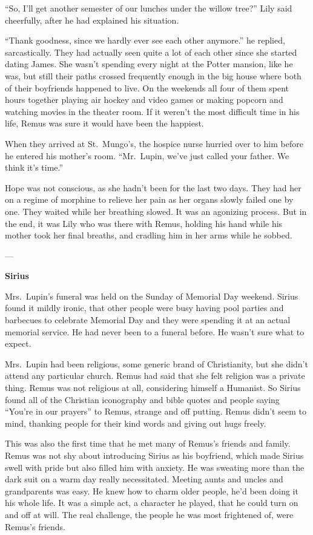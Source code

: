 \documentclass[12pt,twoside,openright]{memoir}
\begin{document}
``So, I'll get another semester of our lunches under the willow tree?'' Lily said cheerfully, after he had explained his situation.

``Thank goodness, since we hardly ever see each other anymore.'' he replied, sarcastically. They had actually seen quite a lot of each other since she started dating James. She wasn't spending every night at the Potter mansion, like he was, but still their paths crossed frequently enough in the big house where both of their boyfriends happened to live. On the weekends all four of them spent hours together playing air hockey and video games or making popcorn and watching movies in the theater room. If it weren't the most difficult time in his life, Remus was sure it would have been the happiest.

When they arrived at St.\ Mungo's, the hospice nurse hurried over to him before he entered his mother's room. ``Mr.\ Lupin, we've just called your father. We think it's time.''

Hope was not conscious, as she hadn't been for the last two days. They had her on a regime of morphine to relieve her pain as her organs slowly failed one by one. They waited while her breathing slowed. It was an agonizing process. But in the end, it was Lily who was there with Remus, holding his hand while his mother took her final breaths, and cradling him in her arms while he sobbed.

---

\textbf{Sirius} 

Mrs.\ Lupin's funeral was held on the Sunday of Memorial Day weekend. Sirius found it mildly ironic, that other people were busy having pool parties and barbecues to celebrate Memorial Day and they were spending it at an actual memorial service. He had never been to a funeral before. He wasn't sure what to expect.

Mrs.\ Lupin had been religious, some generic brand of Christianity, but she didn't attend any particular church. Remus had said that she felt religion was a private thing. Remus was not religious at all, considering himself a Humanist. So Sirius found all of the Christian iconography and bible quotes and people saying ``You're in our prayers'' to Remus, strange and off putting. Remus didn't seem to mind, thanking people for their kind words and giving out hugs freely. 

This was also the first time that he met many of Remus's friends and family. Remus was not shy about introducing Sirius as his boyfriend, which made Sirius swell with pride but also filled him with anxiety. He was sweating more than the dark suit on a warm day really necessitated. Meeting aunts and uncles and grandparents was easy. He knew how to charm older people, he'd been doing it his whole life. It was a simple act, a character he played, that he could turn on and off at will. The real challenge, the people he was most frightened of, were Remus's friends.
\end{document}
